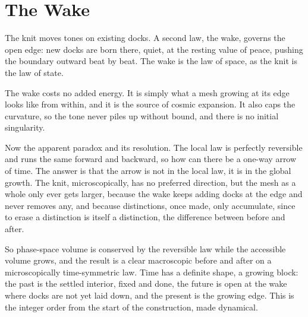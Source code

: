 \section{The Wake}

The knit moves tones on existing docks. A second law, the wake, governs the open edge: new docks are born there, quiet,
at the resting value of peace, pushing the boundary outward beat by beat. The wake is the law of space, as the knit is
the law of state.

The wake costs no added energy. It is simply what a mesh growing at its edge looks like from within, and it is the
source of cosmic expansion. It also caps the curvature, so the tone never piles up without bound, and there is no initial
singularity.

Now the apparent paradox and its resolution. The local law is perfectly reversible and runs the same forward and
backward, so how can there be a one-way arrow of time. The answer is that the arrow is not in the local law, it is in the
global growth. The knit, microscopically, has no preferred direction, but the mesh as a whole only ever gets larger,
because the wake keeps adding docks at the edge and never removes any, and because distinctions, once made, only
accumulate, since to erase a distinction is itself a distinction, the difference between before and after.

So phase-space volume is conserved by the reversible law while the accessible volume grows, and the result is a clear
macroscopic before and after on a microscopically time-symmetric law. Time has a definite shape, a growing block: the
past is the settled interior, fixed and done, the future is open at the wake where docks are not yet laid down, and the
present is the growing edge. This is the integer order from the start of the construction, made dynamical.
